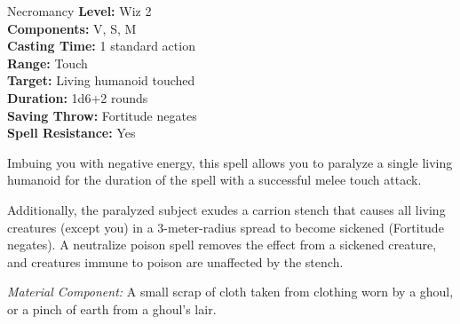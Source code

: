 {Necromancy}
{
	\textbf{Level:}
	Wiz 2\\
	\textbf{Components:}
	V, S, M\\
	\textbf{Casting Time:}
	1 standard action\\
	\textbf{Range:}
	Touch\\
	\textbf{Target:}
	Living humanoid touched\\
	\textbf{Duration:}
	1d6+2 rounds\\
	\textbf{Saving Throw:}
	Fortitude negates\\
	\textbf{Spell Resistance:}
	Yes\\
}
{
	Imbuing you with negative energy, this spell allows you to paralyze a single living humanoid for the duration of the spell with a successful melee touch attack.

	Additionally, the paralyzed subject exudes a carrion stench that causes all living creatures (except you) in a 3-meter-radius spread to become sickened (Fortitude negates). A neutralize poison spell removes the effect from a sickened creature, and creatures immune to poison are unaffected by the stench.

	\textit{Material Component:}
	A small scrap of cloth taken from clothing worn by a ghoul, or a pinch of earth from a ghoul's lair.

}
